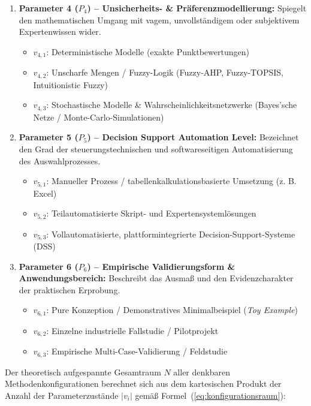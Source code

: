 \begin{enumerate}
    \item \textbf{Parameter 4 ($P_4$) -- Unsicherheits- \& Präferenzmodellierung:} Spiegelt den mathematischen Umgang mit vagem, unvollständigem oder subjektivem Expertenwissen wider.
    \begin{itemize}
        \item $v_{4,1}$: Deterministische Modelle (exakte Punktbewertungen)
        \item $v_{4,2}$: Unscharfe Mengen / Fuzzy-Logik (Fuzzy-AHP, Fuzzy-TOPSIS, Intuitionistic Fuzzy)
        \item $v_{4,3}$: Stochastische Modelle \& Wahrscheinlichkeitsnetzwerke (Bayes'sche Netze / Monte-Carlo-Simulationen)
    \end{itemize}

    \item \textbf{Parameter 5 ($P_5$) -- Decision Support Automation Level:} Bezeichnet den Grad der steuerungstechnischen und softwareseitigen Automatisierung des Auswahlprozesses.
    \begin{itemize}
        \item $v_{5,1}$: Manueller Prozess / tabellenkalkulationsbasierte Umsetzung (z. B. Excel)
        \item $v_{5,2}$: Teilautomatisierte Skript- und Expertensystemlösungen
        \item $v_{5,3}$: Vollautomatisierte, plattformintegrierte Decision-Support-Systeme (DSS)
    \end{itemize}

    \item \textbf{Parameter 6 ($P_6$) -- Empirische Validierungsform \& Anwendungsbereich:} Beschreibt das Ausmaß und den Evidenzcharakter der praktischen Erprobung.
    \begin{itemize}
        \item $v_{6,1}$: Pure Konzeption / Demonstratives Minimalbeispiel (\textit{Toy Example})
        \item $v_{6,2}$: Einzelne industrielle Fallstudie / Pilotprojekt
        \item $v_{6,3}$: Empirische Multi-Case-Validierung / Feldstudie
    \end{itemize}
\end{enumerate}

Der theoretisch aufgespannte Gesamtraum $N$ aller denkbaren Methodenkonfigurationen berechnet sich aus dem kartesischen Produkt der Anzahl der Parameterzustände $|v_i|$ gemäß Formel~(\ref{eq:konfigurationsraum}):

